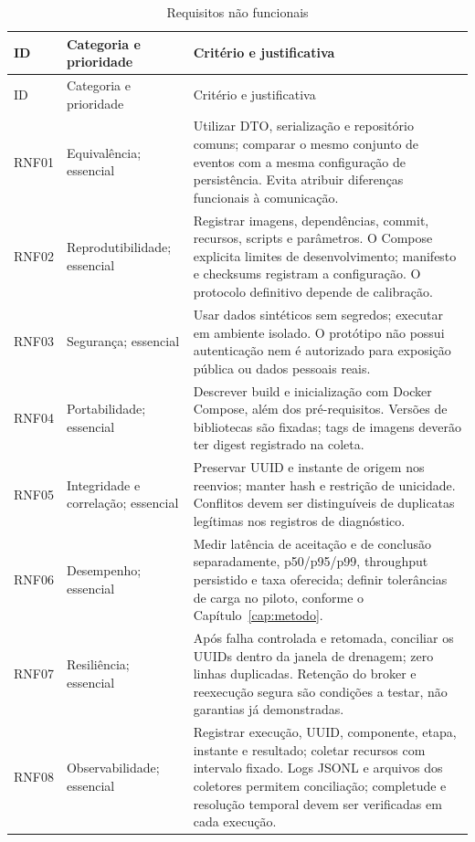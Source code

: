{\small
\begin{longtable}{>{\raggedright\arraybackslash}p{}>{\raggedright\arraybackslash}p{}>{\raggedright\arraybackslash}p{}}
\caption{Requisitos não funcionais}\label{tab:rnf}\\
\hline ID & Categoria e prioridade & Critério e justificativa\\ \hline
\endfirsthead
\hline ID & Categoria e prioridade & Critério e justificativa\\ \hline
\endhead
RNF01 & Equivalência; essencial & Utilizar DTO, serialização e repositório comuns; comparar o mesmo conjunto de eventos com a mesma configuração de persistência. Evita atribuir diferenças funcionais à comunicação.\\ \hline
RNF02 & Reprodutibilidade; essencial & Registrar imagens, dependências, commit, recursos, scripts e parâmetros. O Compose explicita limites de desenvolvimento; manifesto e checksums registram a configuração. O protocolo definitivo depende de calibração.\\ \hline
RNF03 & Segurança; essencial & Usar dados sintéticos sem segredos; executar em ambiente isolado. O protótipo não possui autenticação nem é autorizado para exposição pública ou dados pessoais reais.\\ \hline
RNF04 & Portabilidade; essencial & Descrever build e inicialização com Docker Compose, além dos pré-requisitos. Versões de bibliotecas são fixadas; tags de imagens deverão ter digest registrado na coleta.\\ \hline
RNF05 & Integridade e correlação; essencial & Preservar UUID e instante de origem nos reenvios; manter hash e restrição de unicidade. Conflitos devem ser distinguíveis de duplicatas legítimas nos registros de diagnóstico.\\ \hline
RNF06 & Desempenho; essencial & Medir latência de aceitação e de conclusão separadamente, p50/p95/p99, throughput persistido e taxa oferecida; definir tolerâncias de carga no piloto, conforme o Capítulo~\ref{cap:metodo}.\\ \hline
RNF07 & Resiliência; essencial & Após falha controlada e retomada, conciliar os UUIDs dentro da janela de drenagem; zero linhas duplicadas. Retenção do broker e reexecução segura são condições a testar, não garantias já demonstradas.\\ \hline
RNF08 & Observabilidade; essencial & Registrar execução, UUID, componente, etapa, instante e resultado; coletar recursos com intervalo fixado. Logs JSONL e arquivos dos coletores permitem conciliação; completude e resolução temporal devem ser verificadas em cada execução.\\ \hline

\end{longtable}}

